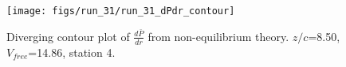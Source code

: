 \begin{figure}[H]
\centering
\texttt{[image: figs/run\_31/run\_31\_dPdr\_contour]}
\caption{Diverging contour plot of $\frac{d\bar{P}}{dr}$ from non-equilibrium theory. $z/c$=8.50, $V_{free}$=14.86, station 4.}
\label{fig:run_31_dPdr_contour}
\end{figure}


